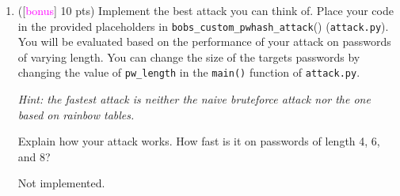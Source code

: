 \documentclass[11pt,letterpaper]{article}
\newenvironment{answer}{\em \color{blue} \begin{adjustwidth}{1cm}{1cm}}{\end{adjustwidth}}
\begin{document}
\begin{enumerate}
\begin{answer}
			Hashing it again will not address this fundamental weaknesses. Therefore, in order to make the scheme stronger, we have to directly address the mentioned weaknesses by doing followings.
			
			\begin{itemize}
				\item Make it a requirement to have a minimum length (at least 8) to the bare password and add salt directly to the password parts to make the brute-forcing difficult. Eg. $p1 + s \geq 8 ~\&~ p2 + s \geq 8 $ will be a good choice.
				
				\item Increase the number of bytes ($l$) that we consider when building the password hash. This will make it more collision resistant.
			\end{itemize} 
			
		\end{answer}
		
		
		\item ([\textcolor{magenta}{bonus}] 10 pts) Implement the best attack you can think of. Place your code in the provided placeholders in \texttt{bobs\_custom\_pwhash\_attack}() (\texttt{attack.py}). You will be evaluated based on the performance of your attack on passwords of varying length. You can change the size of the targets passwords by changing the value of \texttt{pw\_length} in the \texttt{main()} function of \texttt{attack.py}.
		
		{\em Hint: the fastest attack is neither the naive bruteforce attack nor the one based on rainbow tables.}
		
		Explain how your attack works. How fast is it on passwords of length 4, 6, and 8?
		
		\begin{answer}
			
			Not implemented.
			
		\end{answer}
		
	\end{enumerate}
	
\end{document}
